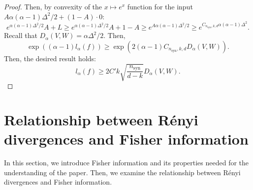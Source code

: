 \documentclass{article}
\theoremstyle{plain}
\theoremstyle{definition}
\theoremstyle{remark}
\begin{document}
\begin{proof}
Then, by convexity of the $x \mapsto e^x$ function for the input $A \alpha(\alpha-1)\Delta^2/2 + (1-A)\cdot 0$:
\[e^{\alpha(\alpha-1)\Delta^2/2} A+ L \geq e^{\alpha(\alpha-1)\Delta^2/2} A+ 1-A \geq e^{A\alpha(\alpha-1)\Delta^2/2} \geq  e^{C_{n_{\text{syn}},k,d}\alpha(\alpha-1)\Delta^2}.\]
Recall that $D_\alpha(V,W) = \alpha\Delta^2/2$. Then, 
\[\exp((\alpha-1)l_\alpha(f)) \geq \exp(2(\alpha-1) C_{n_{\text{syn}},k,d} D_\alpha(V,W)).\]
Then, the desired result holds:
\[l_\alpha(f) \geq 2C'k\sqrt{\frac{n_{\text{syn}}}{d-k}}D_\alpha(V,W).\]
\end{proof}

\newpage
\section{Relationship between Rényi divergences and Fisher information}
\label{app:Renyi-Fisher}

In this section, we introduce Fisher information and its properties needed for the understanding of the paper. Then, we examine the relationship between Rényi divergences and Fisher information.
\end{document}
